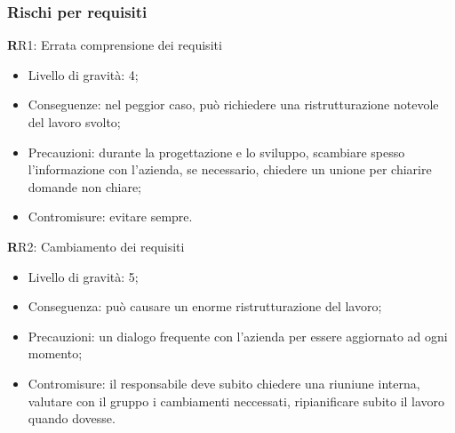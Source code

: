 \subsubsection{Rischi per requisiti}
\textbf RR1: 
Errata comprensione dei requisiti
\begin{itemize}
\item Livello di gravità: 4;
\item Conseguenze: nel peggior caso, può richiedere una ristrutturazione notevole del lavoro svolto;
\item Precauzioni: durante la progettazione e lo sviluppo, scambiare spesso l’informazione con l’azienda, se necessario, chiedere un unione per chiarire domande non chiare;
\item Contromisure: evitare sempre.
\end{itemize}
\textbf RR2:
Cambiamento dei requisiti
\begin{itemize}
\item Livello di gravità: 5;
\item Conseguenza: può causare un enorme ristrutturazione del lavoro;
\item Precauzioni: un dialogo frequente con l'azienda per essere aggiornato ad ogni momento;
\item Contromisure: il responsabile deve subito chiedere una riuniune interna, valutare con il gruppo i cambiamenti neccessati, ripianificare subito il lavoro quando dovesse.
\end{itemize}



